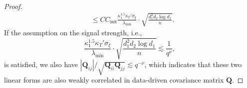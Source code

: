 \documentclass[12pt]{article}
\newcommand{\abs}[1]{\left\lvert#1\right\rvert}
\newcommand{\init}{{\mathsf{init}}}
\theoremstyle{plain}
\begin{document}
\begin{proof}
\begin{equation*}
\begin{aligned}
    &\le  CC_{\init}\frac{\kappa_1^{1.5} \kappa_T'  \sigma_{\xi} }{ \lambda_{\min}  }\cdot \sqrt{\frac{ d_1^2 d_2 \log d_1}{n}}.
\end{aligned}
\end{equation*}
If the assumption on the signal strength, i.e.,
\begin{equation*}
     \frac{\kappa_1^{1.5} \kappa_T'  \sigma_{\xi} }{ \lambda_{\min}  }\cdot \sqrt{\frac{ d_1^2 d_2 \log d_1}{n}} \lesssim \frac{1}{q^{\nu}},
\end{equation*}
is satisfied, we also have $ { \abs{\mathbf{Q}_{ij}} }/{\sqrt{\mathbf{Q}_{ii}\mathbf{Q}_{jj}}}\lesssim q^{-\nu} $, which indicates that these two linear forms are also weakly correlated in data-driven covariance matrix $\mathbf{Q}$.
\end{proof}
\end{document}
